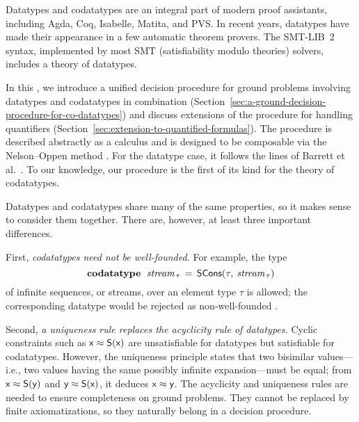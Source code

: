 \nopagebreak

Datatypes and codatatypes are an integral part of modern proof assistants,
including Agda, Coq, Isabelle, Matita, and PVS. In recent years, datatypes
have made their appearance in a few automatic theorem provers. The SMT-LIB~2
\cite{barrett-et-al-2010} syntax, implemented by most SMT (satisfiability
modulo theories) solvers, includes a theory of datatypes.

\pagebreak

In this \thewordpaper, we introduce a unified decision procedure for ground
problems involving datatypes and codatatypes in combination
(Section~\ref{sec:a-ground-decision-procedure-for-co-datatypes})
and discuss extensions  of the procedure for handling quantifiers
(Section~\ref{sec:extension-to-quantified-formulas}).
The procedure is described abstractly as a calculus and is
designed to be composable via the Nelson--Oppen method \cite{nelson-oppen-1979}.
For the datatype case, it follows the lines of Barrett et al.\ \cite{barrett-et-al-2007}.
To our knowledge, our procedure is the first of its kind for the theory of
codatatypes.

Datatypes and codatatypes share many of the same properties, so it makes sense
to consider them together. There are, however, at least three important
differences.

First, \emph{codatatypes need not be well-founded.}
For example, the type
%
\[\textbf{codatatype}~\;\textit{stream}_{\,\tau} \,=\, \textsf{SCons}(\tau,\: \textit{stream}_{\,\tau})\]
%
of infinite sequences, or streams, over an element type $\tau$ is allowed; the
corresponding datatype would be rejected as non-well-founded \cite{blanchette-et-al-2015-esop}.

Second, \emph{a uniqueness rule replaces the acyclicity rule of datatypes.}
Cyclic constraints such as
$\textsf{x} \approx \textsf{S}(\textsf{x})$ %
are unsatisfiable for datatypes but satisfiable for codatatypes.
However, the uniqueness principle states that two bisimilar values---i.e., two values
having the same possibly infinite expansion---must be equal; from $\textsf{x}
\approx \textsf{S}(\textsf{y})$ and
$\textsf{y} \approx \textsf{S}(\textsf{x})$, it deduces $\textsf{x} \approx \textsf{y}$.
The acyclicity and uniqueness rules are needed to ensure completeness on
ground problems. %
They cannot be replaced by
finite axiomatizations, so they naturally belong in a decision procedure.

